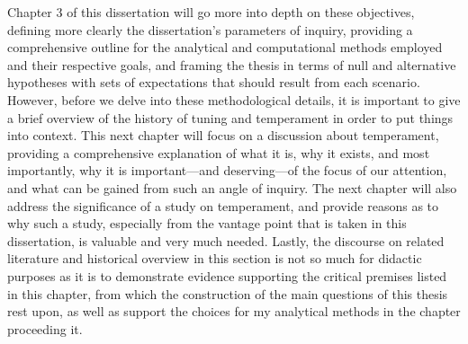 Chapter 3 of this dissertation will go more into depth on these
objectives, defining more clearly the dissertation's parameters of
inquiry, providing a comprehensive outline for the analytical and
computational methods employed and their respective goals, and framing
the thesis in terms of null and alternative hypotheses with sets of
expectations that should result from each scenario. However, before we
delve into these methodological details, it is important to give a brief
overview of the history of tuning and temperament in order to put things
into context. This next chapter will focus on a discussion about
temperament, providing a comprehensive explanation of what it is, why it
exists, and most importantly, why it is important---and deserving---of
the focus of our attention, and what can be gained from such an angle of
inquiry. The next chapter will also address the significance of a study
on temperament, and provide reasons as to why such a study, especially
from the vantage point that is taken in this dissertation, is valuable
and very much needed. Lastly, the discourse on related literature and
historical overview in this section is not so much for didactic purposes
as it is to demonstrate evidence supporting the critical premises listed
in this chapter, from which the construction of the main questions of
this thesis rest upon, as well as support the choices for my analytical
methods in the chapter proceeding it.


    
    
    
